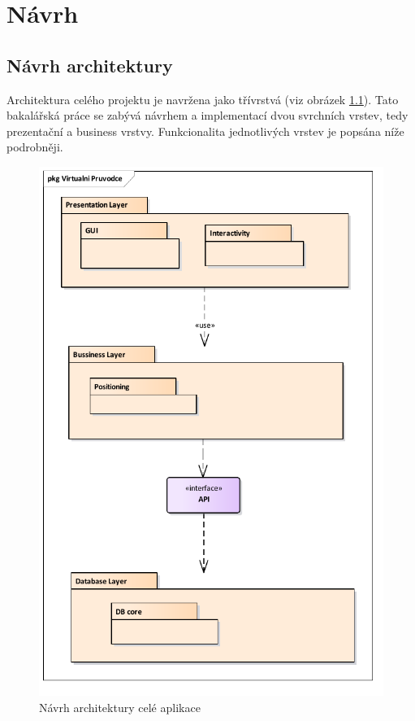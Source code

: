 \documentclass[thesis=B,czech]{FITthesis}[2012/06/26]
\begin{document}
	
	
			

	
\chapter{Návrh}
	\section{Návrh architektury}
	Architektura celého projektu je navržena jako třívrstvá (viz obrázek \ref{fig:architektura}). Tato bakalářská práce se zabývá návrhem a implementací dvou svrchních vrstev, tedy prezentační a business vrstvy. Funkcionalita jednotlivých vrstev je popsána níže podrobněji.
	
	
	\begin{figure}
  		\includegraphics[width=\textwidth,height=\textheight,keepaspectratio]{appArch.pdf}
  		\caption{Návrh architektury celé aplikace}
  		\label{fig:architektura}
	\end{figure}
	
\end{document}
